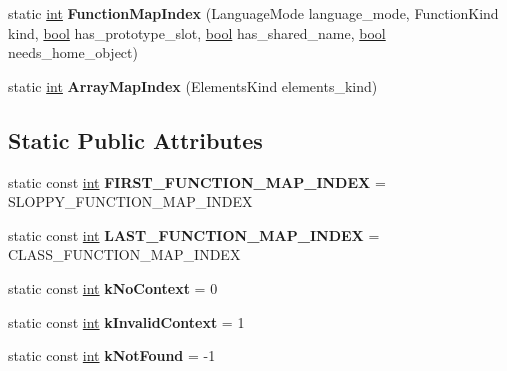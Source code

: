 \begin{DoxyCompactItemize}
\mbox{\label{classv8_1_1internal_1_1Context_a7af89dc75a6251cda09cae26f793ee71}} 
static \mbox{\hyperlink{classint}{int}} {\bfseries Function\+Map\+Index} (Language\+Mode language\+\_\+mode, Function\+Kind kind, \mbox{\hyperlink{classbool}{bool}} has\+\_\+prototype\+\_\+slot, \mbox{\hyperlink{classbool}{bool}} has\+\_\+shared\+\_\+name, \mbox{\hyperlink{classbool}{bool}} needs\+\_\+home\+\_\+object)
\item 
\mbox{\label{classv8_1_1internal_1_1Context_aba6adca649244f5a168e958be581502f}} 
static \mbox{\hyperlink{classint}{int}} {\bfseries Array\+Map\+Index} (Elements\+Kind elements\+\_\+kind)
\end{DoxyCompactItemize}
\subsection*{Static Public Attributes}
\begin{DoxyCompactItemize}
\item 
\mbox{\label{classv8_1_1internal_1_1Context_a290b979c1168cbd7a23485998cdf72a7}} 
static const \mbox{\hyperlink{classint}{int}} {\bfseries F\+I\+R\+S\+T\+\_\+\+F\+U\+N\+C\+T\+I\+O\+N\+\_\+\+M\+A\+P\+\_\+\+I\+N\+D\+EX} = S\+L\+O\+P\+P\+Y\+\_\+\+F\+U\+N\+C\+T\+I\+O\+N\+\_\+\+M\+A\+P\+\_\+\+I\+N\+D\+EX
\item 
\mbox{\label{classv8_1_1internal_1_1Context_ac2f4aae3fa574bf2f5ac215a35b06bb4}} 
static const \mbox{\hyperlink{classint}{int}} {\bfseries L\+A\+S\+T\+\_\+\+F\+U\+N\+C\+T\+I\+O\+N\+\_\+\+M\+A\+P\+\_\+\+I\+N\+D\+EX} = C\+L\+A\+S\+S\+\_\+\+F\+U\+N\+C\+T\+I\+O\+N\+\_\+\+M\+A\+P\+\_\+\+I\+N\+D\+EX
\item 
\mbox{\label{classv8_1_1internal_1_1Context_ac3a9eeba6bd90fbeb2462912bde39a1f}} 
static const \mbox{\hyperlink{classint}{int}} {\bfseries k\+No\+Context} = 0
\item 
\mbox{\label{classv8_1_1internal_1_1Context_a6412702a427f01089e9612a688ba80c8}} 
static const \mbox{\hyperlink{classint}{int}} {\bfseries k\+Invalid\+Context} = 1
\item 
\mbox{\label{classv8_1_1internal_1_1Context_adb2003ecea70022b97b810c1e77b8344}} 
static const \mbox{\hyperlink{classint}{int}} {\bfseries k\+Not\+Found} = -\/1
\end{DoxyCompactItemize}
